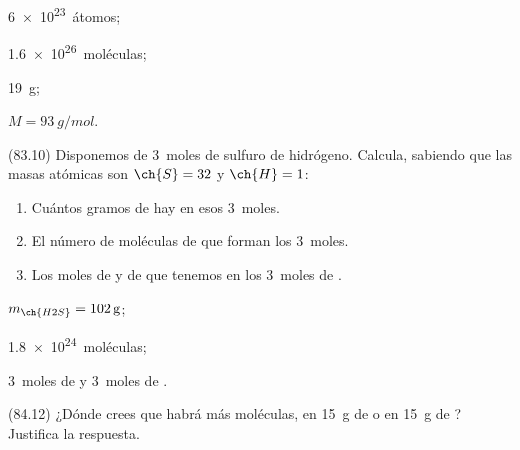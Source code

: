 \documentclass[10pt,a5paper,twoside]{article}
\begin{document}
      \begin{solution}
        \begin{enumerate*}
          \item \SI{6e23}{átomos}; \item \SI{1.6e26}{moléculas}; \item \SI{19}{g}; \item \( M = \SI{93}{g/mol} \).
        \end{enumerate*}
      \end{solution}




      \begin{exercise}[
          tags    = {},
          topics  = {química,química básica},
          source  = {FQ 1B MGH 2016, p83, e10},
        ]
        (83.10) Disponemos de \SI{3}{moles} de sulfuro de hidrógeno. Calcula,
        sabiendo que las masas atómicas son \( \ch{S} = 32 \) y \( \ch{H} = 1 \):
        \begin{enumerate}
          \item Cuántos gramos de  hay en esos \SI{3}{moles}.
          \item El número de moléculas de  que forman los \SI{3}{moles}.
          \item Los moles de  y de  que tenemos en los \SI{3}{moles} de .
        \end{enumerate}
      \end{exercise}

      \begin{solution}
        \begin{enumerate*}
          \item \( m_{\ch{H2S}} = \SI{102}{\gram} \);
          \item \SI{1.8e24}{moléculas};
          \item \SI{3}{moles} de  y \SI{3}{moles} de .
        \end{enumerate*}
      \end{solution}




      \begin{exercise}[
          tags    = {},
          topics  = {química,química básica},
          source  = {FQ 1B MGH 2016, p84, e12},
        ]
        (84.12) ¿Dónde crees que habrá más moléculas, en \SI{15}{g} de  o en
        \SI{15}{g} de ? Justifica la respuesta.
      \end{exercise}
\end{document}
